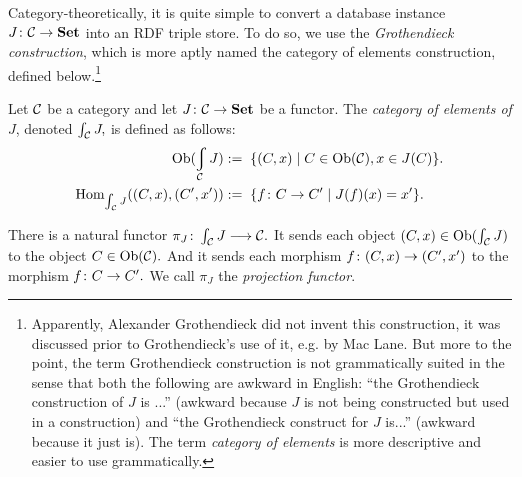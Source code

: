 \documentclass[CT4S-EN-RU]{subfiles}
\begin{document}
\begin{blockRUS}
\end{blockRUS}

\begin{blockENG}
Category-theoretically, it is quite simple to convert a database instance $J\colon\mathcal{C}\rightarrow{\mathbf{Set}}$ into an RDF triple store. To do so, we use the {\em Grothendieck construction}, which is more aptly named the category of elements construction, defined below.\footnote{Apparently, Alexander Grothendieck did not invent this construction, it was discussed prior to Grothendieck's use of it, e.g. by Mac Lane. But more to the point, the term Grothendieck construction is not grammatically suited in the sense that both the following are awkward in English: “the Grothendieck construction of $J$ is ...” (awkward because $J$ is not being constructed but used in a construction) and “the Grothendieck construct for $J$ is...” (awkward because it just is). The term {\em category of elements} is more descriptive and easier to use grammatically.}
\end{blockENG}

\begin{blockRUS}
\end{blockRUS}

\begin{definitionENG}\label{def:grothendieck}
Let $\mathcal{C}$ be a category and let $J\colon\mathcal{C}\rightarrow{\mathbf{Set}}$ be a functor. The {\em category of elements of $J$}, denoted $\int_\mathcal{C} J,$ is defined as follows:
\begin{align*}
\Ob(\varint_\mcC J):=&\;\;\{(C,x)\|C\in\Ob(\mcC), x\in J(C)\}.\\
\Hom_{\int_\mcC J}((C,x),(C',x')):=&\;\;\{f\taking C\to C'\|J(f)(x)=x'\}.
\end{align*}

There is a natural functor $\pi_J\colon\int_\mathcal{C} J\longrightarrow\mathcal{C}.$ It sends each object $(C,x)\in\textnormal{Ob}(\int_\mathcal{C} J)$ to the object $C\in\textnormal{Ob}(\mathcal{C}).$ And it sends each morphism $f\colon (C,x)\rightarrow (C',x')$ to the morphism $f\colon C\rightarrow C'.$ We call $\pi_J$ the {\em projection functor}.
\end{definitionENG}

\begin{definitionRUS}\label{def:grothendieck}
\end{definitionRUS}
\end{document}
